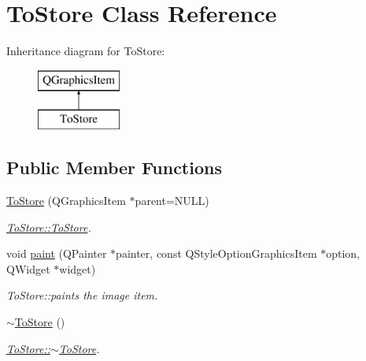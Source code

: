 \hypertarget{class_to_store}{\section{To\-Store Class Reference}
\label{class_to_store}
}
Inheritance diagram for To\-Store\-:\begin{figure}[H]
\begin{center}
\leavevmode
\includegraphics[height=2.000000cm]{class_to_store}
\end{center}
\end{figure}
\subsection*{Public Member Functions}
\begin{DoxyCompactItemize}
\item 
\hyperlink{class_to_store_a779ebd6b15419c4344946ce5b2a0064f}{To\-Store} (Q\-Graphics\-Item $\ast$parent=N\-U\-L\-L)
\begin{DoxyCompactList}\small\item\em \hyperlink{class_to_store_a779ebd6b15419c4344946ce5b2a0064f}{To\-Store\-::\-To\-Store}. \end{DoxyCompactList}\item 
void \hyperlink{class_to_store_aafd1a71a2edb0aae214a6747ce83a2bc}{paint} (Q\-Painter $\ast$painter, const Q\-Style\-Option\-Graphics\-Item $\ast$option, Q\-Widget $\ast$widget)
\begin{DoxyCompactList}\small\item\em To\-Store\-::paints the image item. \end{DoxyCompactList}\item 
\hypertarget{class_to_store_a8d4e9f0a522b741f24f6bc404457bd83}{\hyperlink{class_to_store_a8d4e9f0a522b741f24f6bc404457bd83}{$\sim$\-To\-Store} ()}\label{class_to_store_a8d4e9f0a522b741f24f6bc404457bd83}

\begin{DoxyCompactList}\small\item\em \hyperlink{class_to_store_a8d4e9f0a522b741f24f6bc404457bd83}{To\-Store\-::$\sim$\-To\-Store}. \end{DoxyCompactList}\end{DoxyCompactItemize}
